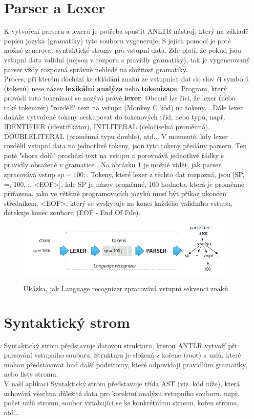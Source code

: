 \section{Parser a Lexer}
K vytvoření parseru a lexeru je potřeba spustit ANLTR nástroj, který na základě popisu jazyka (gramatiky) tyto souboru vygeneruje. S jejich pomocí je poté možné generovat syntaktické stromy pro vstupní data. Zde platí, že pokud jsou vstupní data validní (nejsou v rozporu s pravidly gramatiky), tak je vygenerovaný parser vždy rozpozná správně nehledě na složitost gramatiky.\\
Proces, při kterém dochází ke skládání znaků ze vstupních dat do slov či symbolů (tokenů) nese název \textbf{lexikální analýza} nebo \textbf{tokenizace}. Program, který provádí tuto tokenizaci se nazývá právě \textbf{lexer}. Obecně lze říci, že lexer (nebo také tokenizér) "rozdělí" text na vstupu (Monkey C kód) na tokeny. \cite{ANTLR_PG_20}. Dále lexer dokáže vytvořené tokeny seskupovat do tokenových tříd, nebo typů, např. IDENTIFIER (identifikátor), INTLITERAL (celočíselná proměnná), DOUBLELITERAL (proměnná typu double), atd...
V momentě, kdy lexer rozdělil vstupní data na jednotlivé tokeny, jsou tyto tokeny předány parseru. Ten poté "shora dolů" prochází text na vstupu a porovnává jednotlivé řádky s pravidly obsažené v gramatice \cite{ANTLR_PG_20}. Na obrázku \ref{img:parser} je možné vidět, jak parser zpracovává vstup $sp = 100;$. Tokeny, které lexer z těchto dat rozpozná, jsou [SP, =, 100, ;, <EOF>], kde SP je název proměnné, 100 hodnota, která je proměnné přiřazena, jako ve většině programovacích jazyků musí být příkaz ukončen středníkem, <EOF>, který se vyskytuje na konci každého validního vstupu, detekuje konec souboru (EOF - End Of File).


\begin{figure}[b!]
	\centering
	\includegraphics[scale=0.7]{images/parser}
	\caption{Ukázka, jak Language recognizer zpracovává vstupní sekvenci znaků} 			    \cite{ANTLR_PG_10}
	\label{img:parser}
\end{figure}

\section{Syntaktický strom}
Syntaktický strom představuje datovou strukturu, kterou ANTLR vytvoří při parsování vstupního souboru. Struktura je složená z kořene (root) a uzlů, které mohou představovat buď další podstromy, které odpovídají pravidlům gramatiky, nebo listy stromu.\\ 
V naší aplikaci Syntaktický strom představuje třída AST (viz. kód níže), která uchovává všechna důležitá data pro korektní analýzu vstupního souboru, např. počet uzlů stromu, soubor vztahující se ke konkrétnímu stromu, kořen stromu, atd...


